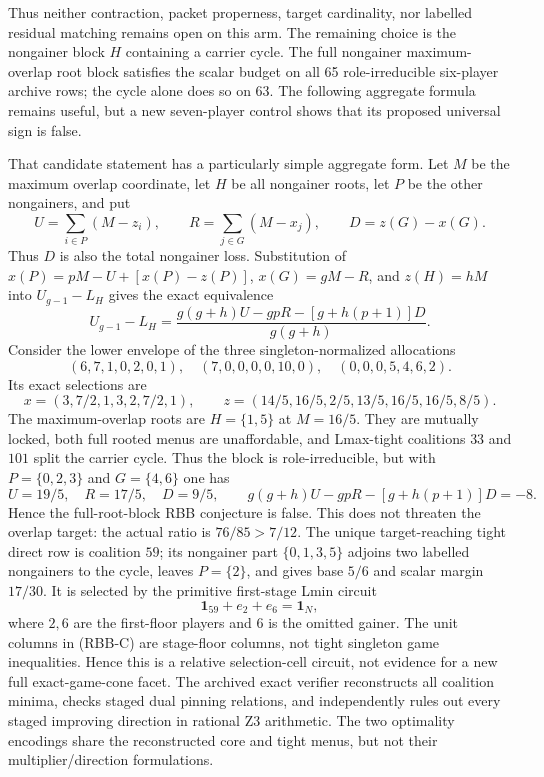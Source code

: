 \documentclass[11pt]{article}
\begin{document}
Thus neither contraction, packet properness, target cardinality, nor labelled
residual matching remains open on this arm.  The remaining choice is the
nongainer block $H$ containing a carrier cycle.  The full nongainer
maximum-overlap root block satisfies the scalar budget on all 65
role-irreducible six-player archive rows; the cycle alone does so on 63.
The following aggregate formula remains useful, but a new seven-player
control shows that its proposed universal sign is false.

That candidate statement has a particularly simple aggregate form.  Let $M$ be
the maximum overlap coordinate, let $H$ be all nongainer roots, let $P$ be
the other nongainers, and put
\[
 U=\sum_{i\in P}(M-z_i),\qquad
 R=\sum_{j\in G}(M-x_j),\qquad
 D=z(G)-x(G).
\]
Thus $D$ is also the total nongainer loss.  Substitution of
$x(P)=pM-U+[x(P)-z(P)]$, $x(G)=gM-R$, and
$z(H)=hM$ into $U_{g-1}-L_H$ gives the exact equivalence
\[
 U_{g-1}-L_H=
 \frac{g(g+h)U-gpR-[g+h(p+1)]D}{g(g+h)}.            \tag{RBB}
\]
Consider the lower envelope of the three singleton-normalized allocations
\[
 (6,7,1,0,2,0,1),\quad (7,0,0,0,0,10,0),\quad
 (0,0,0,5,4,6,2).
\]
Its exact selections are
\[
 x=(3,7/2,1,3,2,7/2,1),\qquad
 z=(14/5,16/5,2/5,13/5,16/5,16/5,8/5).
\]
The maximum-overlap roots are $H=\{1,5\}$ at $M=16/5$.  They are
mutually locked, both full rooted menus are unaffordable, and Lmax-tight
coalitions $33$ and $101$ split the carrier cycle.  Thus the block is
role-irreducible, but with $P=\{0,2,3\}$ and $G=\{4,6\}$ one has
\[
 U=19/5,\quad R=17/5,\quad D=9/5,\qquad
 g(g+h)U-gpR-[g+h(p+1)]D=-8.                       \tag{RBB-CE}
\]
Hence the full-root-block RBB conjecture is false.  This does not threaten
the overlap target: the actual ratio is $76/85>7/12$.  The unique
target-reaching tight direct row is coalition $59$; its nongainer part
$\{0,1,3,5\}$ adjoins two labelled nongainers to the cycle, leaves
$P=\{2\}$, and gives base $5/6$ and scalar margin $17/30$.
It is selected by the primitive first-stage Lmin circuit
\[
 \mathbf 1_{59}+e_2+e_6=\mathbf 1_N,                \tag{RBB-C}
\]
where $2,6$ are the first-floor players and $6$ is the omitted gainer.
The unit columns in (RBB-C) are stage-floor columns, not tight singleton game
inequalities.  Hence this is a relative selection-cell circuit, not evidence
for a new full exact-game-cone facet.
The archived exact verifier reconstructs all coalition minima, checks staged
dual pinning relations, and independently rules out every staged improving
direction in rational Z3 arithmetic.  The two optimality encodings share the
reconstructed core and tight menus, but not their multiplier/direction
formulations.
\end{document}
